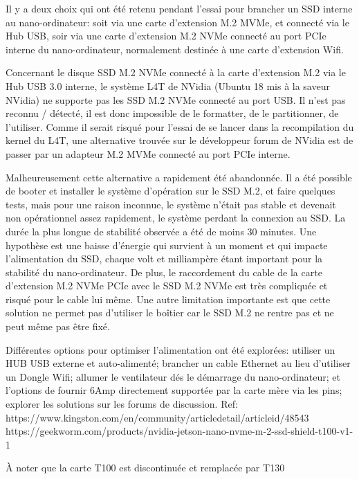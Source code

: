 \par Il y a deux choix qui ont été retenu pendant l'essai pour brancher un SSD interne au nano-ordinateur: soit via une carte d'extension M.2 MVMe, et connecté via le Hub USB, soir via une carte d'extension M.2 NVMe connecté au port PCIe interne du nano-ordinateur, normalement destinée à une carte d'extension Wifi.
\par Concernant le disque SSD M.2 NVMe connecté à la carte d'extension M.2 via le Hub USB 3.0 interne, le système L4T de NVidia (Ubuntu 18 mis à la saveur NVidia) ne supporte pas les SSD M.2 NVMe connecté au port USB. Il n'est pas reconnu / détecté, il est donc impossible de le formatter, de le partitionner, de l'utiliser. Comme il serait risqué pour l'essai de se lancer dans la recompilation du kernel du L4T, une alternative trouvée sur le développeur forum de NVidia est de passer par un adapteur M.2 MVMe connecté au port PCIe interne.
\par Malheureusement cette alternative a rapidement été abandonnée. Il a été possible de booter et installer le système d'opération sur le SSD M.2, et faire quelques tests, mais pour une raison inconnue, le système n'était pas stable et devenait non opérationnel assez rapidement, le système perdant la connexion au SSD. La durée la plus longue de stabilité observée a été de moins 30 minutes. Une hypothèse est une baisse d'énergie qui survient à un moment et qui impacte l'alimentation du SSD, chaque volt et milliampère étant important pour la stabilité du nano-ordinateur. De plus, le raccordement du cable de la carte d'extension M.2 NVMe PCIe avec le SSD M.2 NVMe est très compliquée et risqué pour le cable lui même. Une autre limitation importante est que cette solution ne permet pas d'utiliser le boîtier car le SSD M.2 ne rentre pas et ne peut même pas être fixé. 
\par Différentes options pour optimiser l'alimentation ont été explorées: utiliser un HUB USB externe et auto-alimenté; brancher un cable Ethernet au lieu d'utiliser un Dongle Wifi; allumer le ventilateur dés le démarrage du nano-ordinateur; et l'options de fournir 6Amp directement supportée par la carte mère via les pins; explorer les solutions sur les forums de discussion. 
Ref: https://www.kingston.com/en/community/articledetail/articleid/48543
https://geekworm.com/products/nvidia-jetson-nano-nvme-m-2-ssd-shield-t100-v1-1
\par À noter que la carte T100 est discontinuée et remplacée par T130
\par [TODO ajout photo] 
